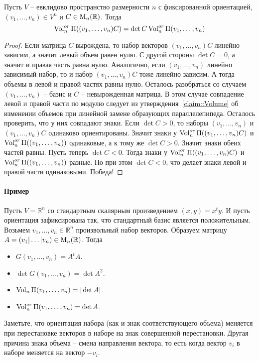 \begin{claim}
Пусть $V$ -- евклидово пространство размерности $n$ с фиксированной ориентацией, $(v_1,\ldots,v_n)\in V^n$ и $C\in \operatorname{M}_{n}(\mathbb R)$. Тогда
\[
\operatorname{Vol}^{or}_n\Pi((v_1,\ldots,v_n)C) = \det C \operatorname{Vol}^{or}_n\Pi(v_1,\ldots,v_n)
\]
\end{claim}
\begin{proof}
Если матрица $C$ вырождена, то набор векторов $(v_1,\ldots,v_n)C$ линейно зависим, а значит левый объем равен  нулю. С другой стороны $\det C = 0$, а значит и правая часть равна нулю. Аналогично, если $(v_1,\ldots,v_n)$ линейно зависимый набор, то и набор $(v_1,\ldots,v_n)C$ тоже линейно зависим. А тогда объемы в левой и правой частях равны нулю. Осталось разобраться со случаем $(v_1,\ldots, v_n)$ -- базис и $C$ -- невырожденная матрица. В этом случае совпадение левой и правой части по модулю следует из утверждения~\ref{claim::Volume} об изменении объемов при линейной замене образующих параллелепипеда. Осталось проверить, что у них совпадают знаки. Если $\det C > 0$, то наборы $(v_1,\ldots,v_n)$ и $(v_1,\ldots, v_n)C$ одинаково ориентированы. Значит знаки у $\operatorname{Vol}^{or}_n\Pi((v_1,\ldots, v_n)C) $ и $\operatorname{Vol}^{or}_n \Pi((v_1,\ldots, v_n))$ одинаковые, а к тому же $\det C > 0$. Значит знаки обеих частей равны. Пусть теперь $\det C < 0$. Тогда знаки у $\operatorname{Vol}^{or}_n\Pi((v_1,\ldots, v_n)C) $ и $\operatorname{Vol}^{or}_n \Pi((v_1,\ldots, v_n))$ разные. Но при этом $\det C < 0$, что делает знаки левой и правой части одинаковыми. Победа!
\end{proof}

\paragraph{Пример}

Пусть $V = \mathbb R^n$ со стандартным скалярным произведением $(x, y) = x^t y$. И пусть ориентация зафиксирована так, что стандартный базис является положительным. Возьмем $v_1,\ldots,v_n\in \mathbb R^n$ произвольный набор векторов. Образуем матрицу $A = (v_1|\ldots|v_n)\in \operatorname{M}_{n}(\mathbb R)$. Тогда 
\begin{itemize}
\item $G(v_1,\ldots,v_n) = A^t A$. 
\item $\det G(v_1,\ldots,v_n) = \det A^2$.
\item $\operatorname{Vol}_n\Pi(v_1,\ldots,v_n) = |\det A|$.
\item $\operatorname{Vol}^{or}_n\Pi(v_1,\ldots,v_n) = \det A$.
\end{itemize}
Заметьте, что ориентация набора (как и знак соответствующего объема) меняется при перестановке векторов в наборе на знак совершенной перестановки. Другая причина знака объема -- смена направления вектора, то есть когда вектор $v_i$ в наборе меняется на вектор $-v_i$.

